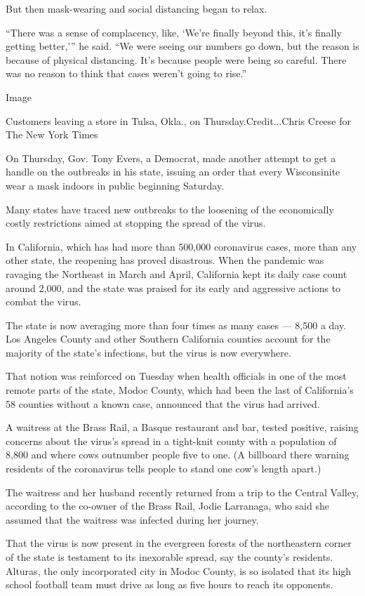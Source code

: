 But then mask-wearing and social distancing began to relax.

``There was a sense of complacency, like, `We're finally beyond this,
it's finally getting better,''' he said. ``We were seeing our numbers go
down, but the reason is because of physical distancing. It's because
people were being so careful. There was no reason to think that cases
weren't going to rise.''

Image

Customers leaving a store in Tulsa, Okla., on Thursday.Credit...Chris
Creese for The New York Times

On Thursday, Gov. Tony Evers, a Democrat, made another attempt to get a
handle on the outbreaks in his state, issuing an order that every
Wisconsinite wear a mask indoors in public beginning Saturday.

Many states have traced new outbreaks to the loosening of the
economically costly restrictions aimed at stopping the spread of the
virus.

In California, which has had more than 500,000 coronavirus cases, more
than any other state, the reopening has proved disastrous. When the
pandemic was ravaging the Northeast in March and April, California kept
its daily case count around 2,000, and the state was praised for its
early and aggressive actions to combat the virus.

The state is now averaging more than four times as many cases --- 8,500
a day. Los Angeles County and other Southern California counties account
for the majority of the state's infections, but the virus is now
everywhere.

That notion was reinforced on Tuesday when health officials in one of
the most remote parts of the state, Modoc County, which had been the
last of California's 58 counties without a known case, announced that
the virus had arrived.

A waitress at the Brass Rail, a Basque restaurant and bar, tested
positive, raising concerns about the virus's spread in a tight-knit
county with a population of 8,800 and where cows outnumber people five
to one. (A billboard there warning residents of the coronavirus tells
people to stand one cow's length apart.)

The waitress and her husband recently returned from a trip to the
Central Valley, according to the co-owner of the Brass Rail, Jodie
Larranaga, who said she assumed that the waitress was infected during
her journey.

That the virus is now present in the evergreen forests of the
northeastern corner of the state is testament to its inexorable spread,
say the county's residents. Alturas, the only incorporated city in Modoc
County, is so isolated that its high school football team must drive as
long as five hours to reach its opponents.

